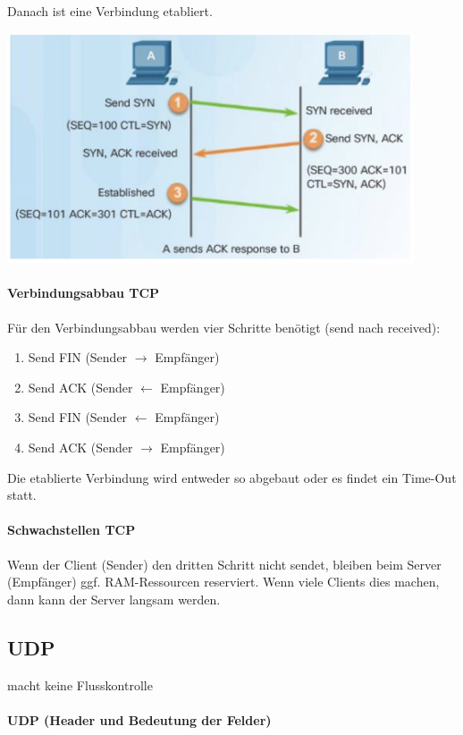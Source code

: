 \documentclass[a4paper,12pt]{article}
\begin{document}
Danach ist eine Verbindung etabliert.


\begin{center}
\includegraphics[width=12cm]{img/09_tcp_handshake.png}
\end{center}

\paragraph{Verbindungsabbau TCP} Für den Verbindungsabbau werden vier Schritte benötigt (send nach received):
\begin{enumerate}
\item Send FIN (Sender $ \rightarrow $ Empfänger)
\item Send ACK (Sender $ \leftarrow $ Empfänger)
\item Send  FIN (Sender $ \leftarrow $ Empfänger)
\item Send  ACK (Sender $ \rightarrow $ Empfänger)
\end{enumerate}

Die etablierte Verbindung wird entweder so abgebaut oder es findet ein Time-Out statt.

\paragraph{Schwachstellen TCP} Wenn der Client (Sender) den dritten Schritt nicht sendet, bleiben beim Server (Empfänger) ggf. RAM-Ressourcen reserviert. Wenn viele Clients dies machen, dann kann der Server langsam werden.





\subsection{UDP}
macht keine Flusskontrolle
\paragraph{UDP (Header und Bedeutung der Felder)}
\end{document}
